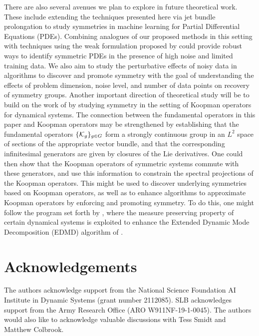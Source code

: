 \documentclass[twoside,11pt]{article}
\begin{document}
There are also several avenues we plan to explore in future theoretical work.
These include extending the techniques presented here via jet bundle prolongation to study symmetries in machine learning for Partial Differential Equations (PDEs).
Combining analogues of our proposed methods in this setting with techniques using the weak formulation proposed by \cite{Messenger2021weak, Reinbold2020using} could provide robust ways to identify symmetric PDEs in the presence of high noise and limited training data.
We also aim to study the perturbative effects of noisy data in algorithms to discover and promote symmetry with the goal of understanding the effects of problem dimension, noise level, and number of data points on recovery of symmetry groups.
Another important direction of theoretical study will be to
build on the work of \cite{peitz2023partial, steyert2022uncovering} by studying symmetry in the setting of Koopman operators for dynamical systems.
The connection between the fundamental operators in this paper and Koopman operators may be strengthened by establishing that the fundamental operators $\{{\mathcal{K}}_g\}_{g\in G}$ form a strongly continuous group in an $L^2$ space of sections of the appropriate vector bundle, and that the corresponding infinitesimal generators are given by closures of the Lie derivatives.
One could then show that the Koopman operators of symmetric systems commute with these generators, and use this information to constrain the spectral projections of the Koopman operators.
This might be used to discover underlying symmetries based on Koopman operators, as well as to enhance algorithms to approximate Koopman operators by enforcing and promoting symmetry.
To do this, one might follow the program set forth by \citet{colbrook2023mpedmd}, where the measure preserving property of certain dynamical systems is exploited to enhance the Extended Dynamic Mode Decomposition (EDMD) algorithm of \cite{Williams2015jnls}.


\section*{Acknowledgements}
The authors acknowledge support from the National Science Foundation AI Institute in Dynamic Systems
(grant number 2112085).  SLB acknowledges support from the Army Research Office (ARO W911NF-19-1-0045). 
The authors would also like to acknowledge valuable discussions with Tess Smidt and Matthew Colbrook.

\begin{spacing}{1}
\setlength{\bibsep}{6.pt}

\end{spacing}
\end{document}
